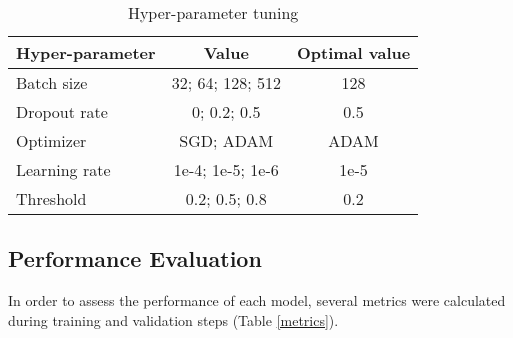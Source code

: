 \documentclass[conference]{IEEEtran}
\begin{document}
\begin{table}[htbp]
    \caption{Hyper-parameter tuning}
    \begin{center}
        \begin{tabular}{lcc}
            \hline
            \textbf{Hyper-parameter}    & \textbf{Value}     & \textbf{Optimal value}\\
            \hline
            Batch size                  & 32; 64; 128; 512  & 128                   \\
            Dropout rate                & 0; 0.2; 0.5         & 0.5                     \\
            Optimizer                   & SGD; ADAM         & ADAM                  \\
            Learning rate                & 1e-4; 1e-5; 1e-6     & 1e-5                    \\
            Threshold                    & 0.2; 0.5; 0.8        & 0.2                    \\
\hline
        \end{tabular}
        \label{hpt}
    \end{center}
\end{table}

\subsection{Performance Evaluation}
In order to assess the performance of each model, several metrics were calculated during training and validation steps (Table \ref{metrics}).
\end{document}
